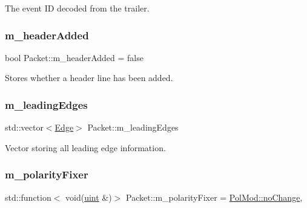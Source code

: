 The event ID decoded from the trailer. 

\mbox{\label{class_packet_aaf9fa3ad2c94bec82a748366fb00ecc7}} 
\subsubsection{\texorpdfstring{m\+\_\+header\+Added}{m\_headerAdded}}
{\footnotesize\ttfamily bool Packet\+::m\+\_\+header\+Added = false\hspace{0.3cm}{\ttfamily [private]}}



Stores whether a header line has been added. 

\mbox{\label{class_packet_afea7ea47b52850e2f68b237036ceb3e1}} 
\subsubsection{\texorpdfstring{m\+\_\+leading\+Edges}{m\_leadingEdges}}
{\footnotesize\ttfamily std\+::vector$<$\hyperlink{class_edge}{Edge}$>$ Packet\+::m\+\_\+leading\+Edges\hspace{0.3cm}{\ttfamily [private]}}



Vector storing all leading edge information. 

\mbox{\label{class_packet_a89f279819afdfb930b201009d821e7f9}} 
\subsubsection{\texorpdfstring{m\+\_\+polarity\+Fixer}{m\_polarityFixer}}
{\footnotesize\ttfamily std\+::function$<$ void(\hyperlink{_packet_8cpp_a69aa29b598b851b0640aa225a9e5d61d}{uint} \&)$>$ Packet\+::m\+\_\+polarity\+Fixer = \hyperlink{namespace_pol_mod_ab917c96757340e5d8901808f819ddf4c}{Pol\+Mod\+::no\+Change}\hspace{0.3cm}{\ttfamily [static]}, {\ttfamily [private]}}



